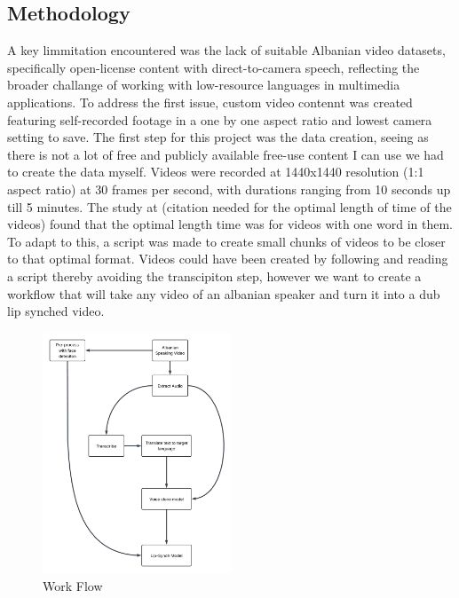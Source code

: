 \documentclass[12pt]{article}
\begin{document}
\subsection{Methodology}
A key limmitation encountered was the lack of suitable Albanian video datasets, specifically open-license content with direct-to-camera speech, reflecting the broader challange of working with low-resource languages in multimedia applications. To address the first issue, custom video contennt was created featuring self-recorded footage in a one by one aspect ratio and lowest camera setting to save. The first step for this project was the data creation, seeing as there is not a lot of free and publicly available free-use content I can use we had to create the data myself.
Videos were recorded at 1440x1440 resolution (1:1 aspect ratio) at 30 frames per second, with durations ranging from 10 seconds up till 5 minutes. The study at (citation needed for the optimal length of time of the videos) found that the optimal length time was for videos with one word in them. To adapt to this, a script was made to create small chunks of videos to be closer to that optimal format. Videos could have been created by following and reading a script thereby avoiding the transcipiton step, however we want to create a workflow that will take any video of an albanian speaker and turn it into a dub lip synched video.

\begin{figure}[h!]
    \centering
    \includegraphics[width=0.5\textwidth]{images/work-flow.png}
    \caption{Work Flow}
    \label{fig:work-flow}
\end{figure}
\end{document}
